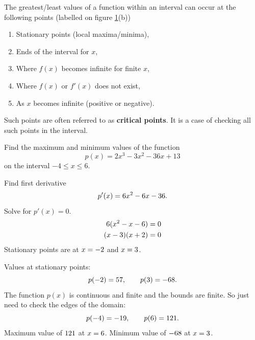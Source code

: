 \begin{figure}[ht]
    \centering
    \hfill
    \caption{}
    \label{fig:minmax}
\end{figure}

The greatest/least values of a function within an interval can occur at the following points (labelled on figure \ref{fig:minmax}(b))
\begin{enumerate}[label=(\Alph*)]
    \item Stationary points (local maxima/minima),
    \item Ends of the interval for $x$,
    \item Where $f(x)$ becomes infinite for finite $x$,
    \item Where $f(x)$ or $f'(x)$ does not exist,
    \item As $x$ becomes infinite (positive or negative).
\end{enumerate}
Such points are often referred to as \textbf{critical points}. It is a case of checking all such points in the interval. 

\goodbreak
\begin{example}[Lecture]
Find the maximum and minimum values of the function
\[
p(x)=2x^3-3x^2-36x+13
\]
on the interval $-4\leq x\leq6$.
\end{example}
%
\begin{solution}
Find first derivative
\[
p'(x)=6x^2-6x-36.
\]
Solve for $p'(x)=0$.
\begin{align*}
    6(x^2-x-6)&=0\\
    (x-3)(x+2)&=0
\end{align*}
Stationary points are at $x=-2$ and $x=3$.

Values at stationary points:
\[
p(-2)=57,\qquad p(3)=-68.
\]
The function $p(x)$ is continuous and finite and the bounds are finite. So just need to check the edges of the domain:
\[
p(-4)=-19,\qquad p(6)=121.
\]
Maximum value of $121$ at $x=6$. Minimum value of $-68$ at $x=3$.
\end{solution}

